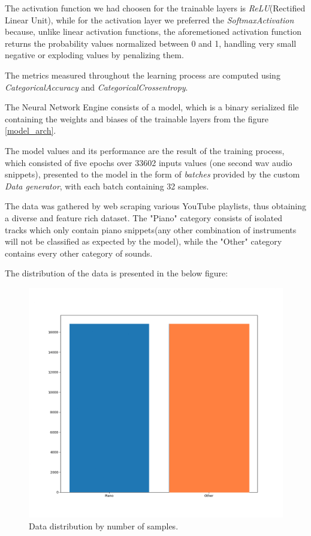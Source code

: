 The activation function we had choosen for the trainable layers is \textit{ReLU}(Rectified Linear Unit), while for
the activation layer we preferred the \textit{SoftmaxActivation} because, unlike linear activation functions,
the aforemetioned activation function returns the probability values normalized between 0 and 1, handling
very small negative or exploding values by penalizing them.


The metrics measured throughout the learning process are computed using \textit{CategoricalAccuracy} and
\textit{CategoricalCrossentropy}.




The Neural Network Engine consists of a model, which is a binary serialized file containing the weights and biases
of the trainable layers from the figure \ref{model_arch}.

The model values and its performance are the result of the training process, which consisted of five epochs over 33602
inputs values (one second wav audio snippets), presented to the model in the form of \textit{batches} provided
by the custom \textit{Data generator}, with each batch containing 32 samples.

The data was gathered by web scraping various YouTube playlists, thus obtaining a diverse and feature rich dataset.
The "Piano" category consists of isolated tracks which only contain piano snippets(any other combination of instruments
will not be classified as expected by the model), while the "Other" category contains every other category of sounds.

The distribution of the data is presented in the below figure:

\begin{figure}[H]
	\centering
	\includegraphics[width = 5.5in]{images/datadistr.png}
	\caption{Data distribution by number of samples.}
\label{dd}
\end{figure}

